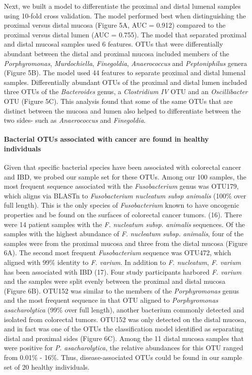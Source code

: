 \documentclass[11pt,]{article}
\let\oldparagraph\paragraph
\renewcommand{\paragraph}[1]{\oldparagraph{#1}\mbox{}}
\begin{document}
Next, we built a model to differentiate the proximal and distal lumenal
samples using 10-fold cross validation. The model performed best when
distinguishing the proximal versus distal mucosa (Figure 5A, AUC =
0.912) compared to the proximal versus distal lumen (AUC = 0.755). The
model that separated proximal and distal mucosal samples used 6
features. OTUs that were differentially abundant between the distal and
proximal mucosa included members of the \emph{Porphyromonas},
\emph{Murdochiella}, \emph{Finegoldia}, \emph{Anaerococcus} and
\emph{Peptoniphilus} genera (Figure 5B). The model used 44 features to
separate proximal and distal lumenal samples. Differentially abundant
OTUs of the proximal and distal lumen included three OTUs of the
\emph{Bacteroides} genus, a \emph{Clostridium IV} OTU and an
\emph{Oscillibacter} OTU (Figure 5C). This analysis found that some of
the same OTUs that are distinct between the mucosa and lumen also helped
to differentiate between the two sides- such as \emph{Anaerococcus} and
\emph{Finegoldia}.

\paragraph{Bacterial OTUs associated with cancer are found in healthy
individuals}\label{bacterial-otus-associated-with-cancer-are-found-in-healthy-individuals}

Given that specific bacterial species have been associated with
colorectal cancer and IBD, we probed our sample set for these OTUs.
Among our 100 samples, the most frequent sequence associated with the
\emph{Fusobacterium} genus was OTU179, which aligns via BLASTn to
\emph{Fusobacterium nucleatum subsp animalis} (100\% over full length).
This is the only species of \emph{Fusobacterium} known to have oncogenic
properties and be found on the surfaces of colorectal cancer tumors.
(16). There were 14 patient samples with the \emph{F. nucleatum subsp.
animalis} sequences. Of the samples with the highest abundance of
\emph{F. nucleatum subsp. animalis}, four of the samples were from the
proximal mucosa and three from the distal mucosa (Figure 6A). The second
most frequent \emph{Fusobacterium} sequence was OTU472, which aligned
with 99\% identity to \emph{F. varium}. In addition to \emph{F.
nucleatum}, \emph{F. varium} has been associated with IBD (17). Four
study participants harbored \emph{F. varium} and the samples were split
evenly between the proximal and distal mucosa (Figure 6B). OTU152 was
similar to the members of the \emph{Porphyromonas} genus and the most
frequent sequence in that OTU aligned to \emph{Porphyromonas
asacharolytica} (99\% over full length), another bacterium commonly
detected and isolated from colorectal tumors. OTU152 was only detected
on the distal mucosa, and in fact was one of the OTUs the classification
model identified as separating distal and proximal sides (Figure 6C).
Among the 11 distal mucosa samples that were positive for \emph{P.
asacharolytica}, the relative abundances for this OTU ranged from 0.01\%
- 16\%. Thus, disease-associated OTUs could be found in our sample set
of 20 healthy individuals.
\end{document}
